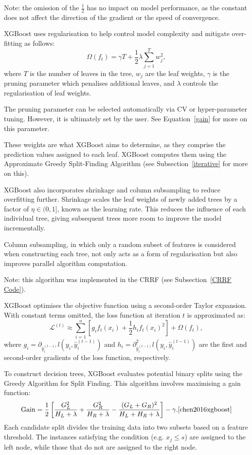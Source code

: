 \documentclass[11pt]{report} %
\begin{document}
\noindent Note: the omission of the $\frac{1}{2}$ has no impact on model performance, as the constant does not affect the direction of the gradient or the speed of convergence.

XGBoost uses regularisation to help control model complexity and mitigate over-fitting as follows:
\[
\Omega(f_t) = \gamma T + \frac{1}{2} \lambda \sum_{j=1}^T w_j^2,
\]
where \( T \) is the number of leaves in the tree, \( w_j \) are the leaf weights, \( \gamma \) is the pruning parameter which penalises additional leaves, and \( \lambda \) controls the regularisation of leaf weights.\cite{chen2016xgboost}  

The pruning parameter can be selected automatically via CV or hyper-parameter tuning. However, it is ultimately set by the user.
See Equation~\ref{gain} for more on this parameter.

These weights are what XGBoost aims to determine, as they comprise the prediction values assigned to each leaf. XGBoost computes them using the Approximate Greedy Split-Finding Algorithm (see Subsection~\ref{iterative} for more on this).

XGBoost also incorporates shrinkage and column subsampling to reduce overfitting further. Shrinkage scales the leaf weights of newly added trees by a factor of \( \eta \in (0, 1] \), known as the learning rate. This reduces the influence of each individual tree, giving subsequent trees more room to improve the model incrementally.\cite{chen2016xgboost}

\noindent Column subsampling, in which only a random subset of features is considered when constructing each tree, not only acts as a form of regularisation but also improves parallel algorithm computation.\cite{chen2016xgboost}

\noindent Note: this algorithm was implemented in the CRRF (see Subsection~\ref{CRRF Code}).

XGBoost optimises the objective function using a second-order Taylor expansion. With constant terms omitted, the loss function at iteration \( t \) is approximated as:
\[
\mathcal{L}^{(t)} \approx \sum_{i=1}^n \left[ g_i f_t(x_i) + \frac{1}{2} h_i f_t(x_i)^2 \right] + \Omega(f_t),
\]
where \( g_i = \partial_{\hat{y}_{i}^{(t-1)}} l(y_i, \hat{y}_{i}^{(t-1)}) \) and \( h_i = \partial_{\hat{y}_{i}^{(t-1)}}^2 l(y_i, \hat{y}_{i}^{(t-1)}) \) are the first and second-order gradients of the loss function, respectively.\cite{chen2016xgboost} 

To construct decision trees, XGBoost evaluates potential binary splits using the Greedy Algorithm for Split Finding. This algorithm involves maximising a gain function:
\begin{equation}
\text{Gain} = \frac{1}{2} \left[ \frac{G_L^2}{H_L + \lambda} + \frac{G_R^2}{H_R + \lambda} - \frac{(G_L + G_R)^2}{H_L + H_R + \lambda} \right] - \gamma.\cite{chen2016xgboost}
\label{gain}
\end{equation}
Each candidate split divides the training data into two subsets based on a feature threshold. The instances satisfying the condition (e.g. \( x_j \leq s \)) are assigned to the left node, while those that do not are assigned to the right node.
\end{document}
